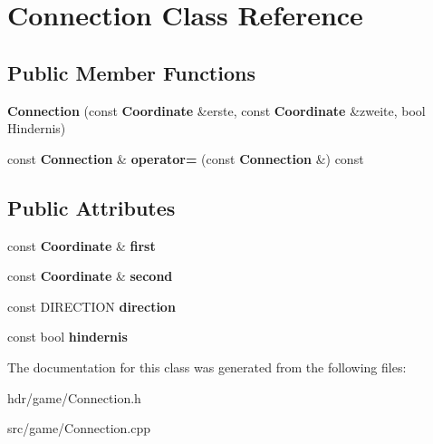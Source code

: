 \section{Connection Class Reference}
\label{class_connection}
\subsection*{Public Member Functions}
\begin{DoxyCompactItemize}
\item 
{\bfseries Connection} (const {\bf Coordinate} \&erste, const {\bf Coordinate} \&zweite, bool Hindernis)\label{class_connection_acff2b5b881817a7b6e8d8173a1937640}

\item 
const {\bf Connection} \& {\bfseries operator=} (const {\bf Connection} \&) const \label{class_connection_a715ee5805776e50b971d5772267e4b46}

\end{DoxyCompactItemize}
\subsection*{Public Attributes}
\begin{DoxyCompactItemize}
\item 
const {\bf Coordinate} \& {\bfseries first}\label{class_connection_a1e4300e2849a2daebf4b1e4577ef1ea8}

\item 
const {\bf Coordinate} \& {\bfseries second}\label{class_connection_a968eaf3cec0996491425d8569e42416f}

\item 
const D\-I\-R\-E\-C\-T\-I\-O\-N {\bfseries direction}\label{class_connection_aa417c011125675e3faf7f5ec1fe4192b}

\item 
const bool {\bfseries hindernis}\label{class_connection_ae29f9a099c5d00919eb45123864fb7f4}

\end{DoxyCompactItemize}


The documentation for this class was generated from the following files\-:\begin{DoxyCompactItemize}
\item 
hdr/game/Connection.\-h\item 
src/game/Connection.\-cpp\end{DoxyCompactItemize}

